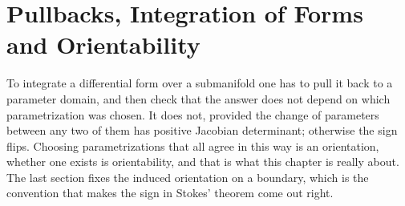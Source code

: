 \chapter{Pullbacks, Integration of Forms and Orientability}
\label{ch:pullbacks}

To integrate a differential form over a submanifold one has to pull it back to a parameter
domain, and then check that the answer does not depend on which parametrization was chosen. It
does not, provided the change of parameters between any two of them has positive Jacobian
determinant; otherwise the sign flips. Choosing parametrizations that all agree in this way is
an orientation, whether one exists is orientability, and that is what this chapter is really
about. The last section fixes the induced orientation on a boundary, which is the convention
that makes the sign in Stokes' theorem come out right.






